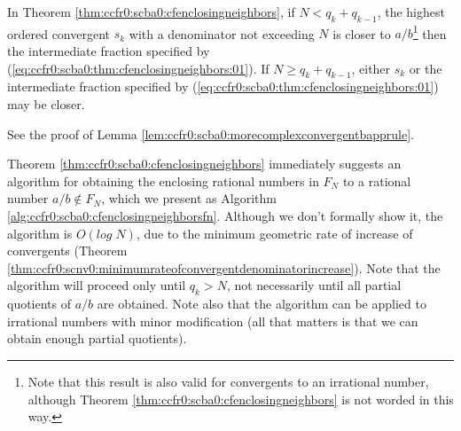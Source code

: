 \begin{vworklemmastatement}
\label{lem:ccfr0:scba0:enclosingneighborstheoremfurtherresult}
In Theorem \ref{thm:ccfr0:scba0:cfenclosingneighbors},
if $N < q_k + q_{k-1}$, the highest ordered convergent
$s_k$ with a denominator not exceeding $N$ is closer to 
$a/b$\footnote{Note that this result is also valid for
convergents to an irrational number, although 
Theorem \ref{thm:ccfr0:scba0:cfenclosingneighbors} is 
not worded in this way.} then the intermediate fraction specified by
(\ref{eq:ccfr0:scba0:thm:cfenclosingneighbors:01}).
If $N \geq q_k + q_{k-1}$, either $s_k$ or the intermediate
fraction specified by (\ref{eq:ccfr0:scba0:thm:cfenclosingneighbors:01})
may be closer.
\end{vworklemmastatement}
\begin{vworklemmaproof}
See the proof of Lemma 
\ref{lem:ccfr0:scba0:morecomplexconvergentbapprule}.
\end{vworklemmaproof}
\vworklemmafooter{}

Theorem \ref{thm:ccfr0:scba0:cfenclosingneighbors} immediately suggests 
an algorithm for obtaining the enclosing rational numbers in $F_N$
to a rational number $a/b \notin F_N$, which we present as
Algorithm \ref{alg:ccfr0:scba0:cfenclosingneighborsfn}.  Although
we don't formally show it, the algorithm is $O(log \; N)$, due to
the minimum geometric rate of increase of convergents 
(Theorem \ref{thm:ccfr0:scnv0:minimumrateofconvergentdenominatorincrease}).
Note that the algorithm will proceed only until $q_k > N$, not necessarily
until all partial quotients of $a/b$ are obtained.  Note also that the
algorithm can be applied to irrational numbers with minor
modification (all that matters is that we can obtain enough
partial quotients).

